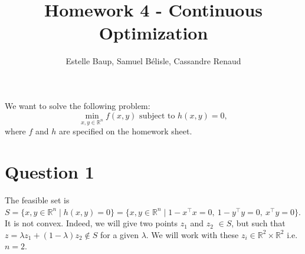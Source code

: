 \documentclass{article}
\title{Homework 4 - Continuous Optimization}
\author{Estelle Baup, Samuel Bélisle, Cassandre Renaud }
\newcommand{\R}{\mathbb{R}}
\newcommand{\tp}{^\top}
\begin{document}
\maketitle

We want to solve the following problem:
\begin{equation*} \tag{P}\label{P}
\min_{x,y\in\R^n} f(x, y) \text{ subject to } h(x,y)=0,
\end{equation*}
where $f$ and $h$ are specified on the homework sheet.

\section*{Question 1}


The feasible set is $S=\{x,y \in \R^n \mid h(x,y)=0\}=\{x,y \in \R^n \mid 1-x\tp x=0,\ 1-y\tp y=0,\ x\tp y=0 \}$. \\
It is not convex. Indeed, we will give two points $z_1$ and $z_2$ $\in S$, but such that $z=\lambda z_1 + (1-\lambda) z_2 \notin S$ for a given $\lambda$. We will work with these $z_i \in \R^2 \times \R^2$ i.e. $n=2$.\\
\end{document}
